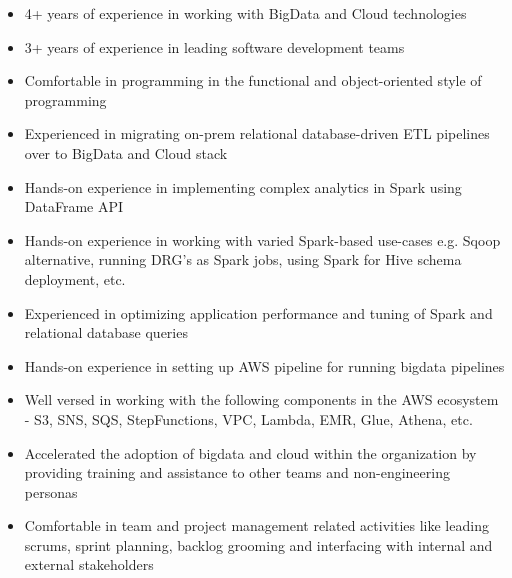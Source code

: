 %
%
%

{
\vspace{1em}
\begin{itemize}
	\item 4+ years of experience in working with BigData and Cloud technologies
	\item 3+ years of experience in leading software development teams
	\item Comfortable in programming in the functional and object-oriented style of programming
	\item Experienced in migrating on-prem relational database-driven ETL pipelines over to BigData and Cloud stack
	\item Hands-on experience in implementing complex analytics in Spark using DataFrame API
	\item Hands-on experience in working with varied Spark-based use-cases e.g. Sqoop alternative, running DRG's as Spark jobs, using Spark for Hive schema deployment, etc.
	\item Experienced in optimizing application performance and tuning of Spark and relational database queries
	\item Hands-on experience in setting up AWS pipeline for running bigdata pipelines
	\item Well versed in working with the following components in the AWS ecosystem - S3, SNS, SQS, StepFunctions, VPC, Lambda, EMR, Glue, Athena, etc.
	\item Accelerated the adoption of bigdata and cloud within the organization by providing training and assistance to other teams and non-engineering personas
	\item Comfortable in team and project management related activities like leading scrums, sprint planning, backlog grooming and interfacing with internal and external stakeholders\\
\end{itemize}
}

